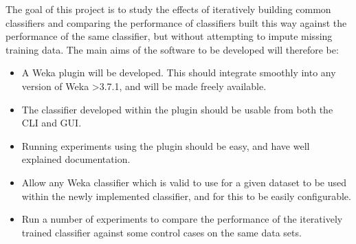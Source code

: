 
The goal of this project is to study the effects of iteratively building common classifiers and comparing the performance of classifiers built this way against the performance of the same classifier, but without attempting to impute missing training data. The main aims of the software to be developed will therefore be:

\begin{itemize}
\item A Weka plugin will be developed. This should integrate smoothly into any version of Weka \textgreater  3.7.1, and will be made freely available. 
\item The classifier developed within the plugin should be usable from both the CLI and GUI.
\item Running experiments using the plugin should be easy, and have well explained documentation.
\item Allow any Weka classifier which is valid to use for a given dataset to be used within the newly implemented classifier, and for this to be easily configurable.
\item Run a number of experiments to compare the performance of the iteratively trained classifier against some control cases on the same data sets.
\end{itemize}
